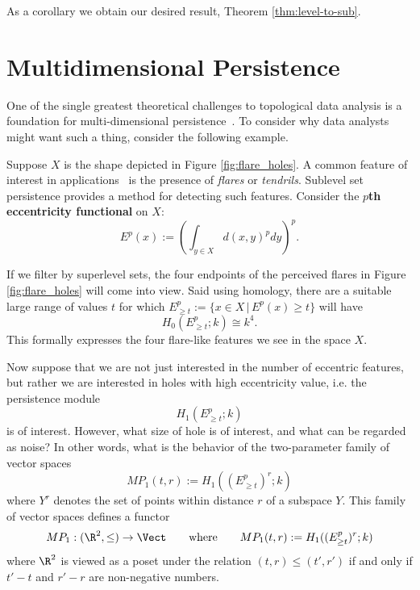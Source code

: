 As a corollary we obtain our desired result, Theorem \ref{thm:level-to-sub}.

\section{Multidimensional Persistence}

One of the single greatest theoretical challenges to topological data analysis is a foundation for multi-dimensional persistence~\cite{lesnick-thesis}. To consider why data analysts might want such a thing, consider the following example.

Suppose $X$ is the shape depicted in Figure \ref{fig:flare_holes}. A common feature of interest in applications~\cite{lum2013extracting} is the presence of \emph{flares} or \emph{tendrils}. Sublevel set persistence provides a method for detecting such features. Consider the \textbf{$p$th eccentricity functional} on $X$:
\[
E^p(x):=\left(\int_{y\in X} d(x,y)^p dy\right)^p.
\]

If we filter by superlevel sets, the four endpoints of the perceived flares in Figure \ref{fig:flare_holes} will come into view. Said using homology, there are a suitable large range of values $t$ for which $E^p_{\geq t}:=\{x\in X\,|\, E^p(x)\geq t\}$ will have
\[
H_0(E^p_{\geq t};k) \cong k^4.
\]
This formally expresses the four flare-like features we see in the space $X$.

Now suppose that we are not just interested in the number of eccentric features, but rather we are interested in holes with high eccentricity value, i.e. the persistence module
\[
H_1(E^p_{\geq t};k)
\]
is of interest. However, what size of hole is of interest, and what can be regarded as noise? In other words, what is the behavior of the two-parameter family of vector spaces
\[
MP_1(t,r):=H_1((E^p_{\geq t})^r;k)
\]
where $Y^r$ denotes the set of points within distance $r$ of a subspace $Y$. This family of vector spaces defines a functor
\[
MP_1:(\R^2,\leq)\to \Vect \qquad \mathrm{where} \qquad MP_1(t,r):=H_1((E^p_{\geq t})^r;k)
\]
where $\R^2$ is viewed as a poset under the relation $(t,r)\leq (t',r')$ if and only if $t'-t$ and $r'-r$ are non-negative numbers. 

